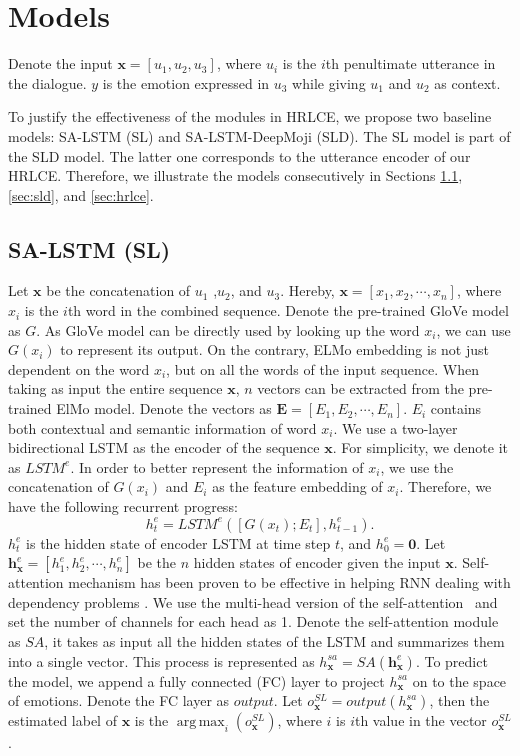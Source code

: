 \documentclass[11pt,a4paper]{article}
\begin{document}
\section{Models}
\label{sec:models}
Denote the input $\bm{x} = [u_1, u_2, u_3]$, where $u_i$ is the $i$th penultimate utterance in the dialogue. $y$ is the emotion expressed in $u_3$ while giving $u_1$ and $u_2$ as context.



To justify the effectiveness of the modules in HRLCE, we propose two baseline models: SA-LSTM (SL) and SA-LSTM-DeepMoji (SLD). The SL model is part of the SLD model. The latter one corresponds to the utterance encoder of our HRLCE. Therefore, we illustrate the models consecutively in Sections \ref{sec:sl}, \ref{sec:sld}, and \ref{sec:hrlce}. 

\subsection{SA-LSTM (SL)}
\label{sec:sl}
Let $\bm{x}$ be the concatenation of $u_1$ ,$u_2$, and $u_3$. Hereby, $\bm{x} = [x_1, x_2, \cdots, x_n]$, where $x_i$ is the $i$th word in the combined sequence.  Denote the pre-trained GloVe model as $G$. As GloVe  model can be directly used by looking up the word $x_i$, we can use $G(x_i)$ to represent its output. 
On the contrary,
ELMo embedding 
is not just dependent on the word $x_i$, but on all the words of the input sequence.
When taking as input the entire sequence $\bm{x}$, $n$ vectors can be extracted from the pre-trained ElMo model. Denote the vectors as $\bm{E} = [E_1, E_2, \cdots, E_n]$. $E_i$ contains both contextual and semantic information of word $x_i$. We use a two-layer bidirectional LSTM as the encoder of the sequence $\bm{x}$. For simplicity, we denote it as $LSTM^e$. 
In order to better represent the information of $x_i$, we use the concatenation of $G(x_i)$ and $E_i$ as the feature embedding of $x_i$. Therefore, we have the following recurrent progress:
\begin{equation}
    h^{e}_{t}  = LSTM^e([G(x_{t}); E_{t}], h^{e}_{t-1}).
\end{equation}
$h_{t}^{e}$ is the hidden state of encoder LSTM at time step $t$, and $h_0^{e} = \bm{0}$. Let $\bm{h}^{e}_{\bm{x}} = [h^{e}_{1}, h^{e}_{2}, \cdots, h^{e}_{n}]$ be the $n$ hidden states of encoder given the input $\bm{x}$. Self-attention mechanism has been proven to be effective in helping RNN dealing with dependency problems \cite{lin2017structured}. We use the multi-head version of the self-attention~\cite{vaswani2017attention} and set the number of channels for each head as 1. Denote the self-attention module as $SA$, it takes as input all the hidden states of the LSTM and summarizes them into a single vector. This process is represented as $h^{sa}_{\bm{x}} = SA(\bm{h}^{e}_{\bm{x}})$. To predict the model, we append a fully connected (FC) layer to project $h^{sa}_{\bm{x}}$ on to the space of emotions. Denote the FC layer as $output$. Let $o^{SL}_{\bm{x}} = output(h^{sa}_{\bm{x}})$, then the estimated label of $\bm{x}$ is 
the
$\operatorname*{arg\,max}_i (o^{SL}_{\bm{x}})$, where $i$ is $i$th value in the vector $o^{SL}_{\bm{x}}$.
\end{document}
